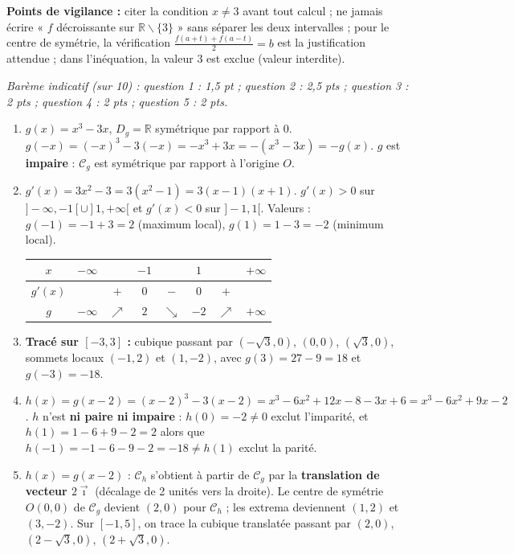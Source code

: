 \documentclass[11pt]{article}
\def\setminus{\mathbin{\backslash}}\let\smallsetminus\setminus
\begin{document}
\begin{corrige}
\begin{enumerate}
    \textbf{Points de vigilance :} citer la condition $x \neq 3$ avant tout calcul ; ne jamais écrire « $f$ décroissante sur $\mathbb{R}\setminus\{3\}$ » sans séparer les deux intervalles ; pour le centre de symétrie, la vérification $\frac{f(a+t)+f(a-t)}{2}=b$ est la justification attendue ; dans l'inéquation, la valeur $3$ est exclue (valeur interdite).
\end{enumerate}
\end{corrige}

\begin{corrige}
\emph{Barème indicatif (sur 10) : question 1 : 1,5 pt ; question 2 : 2,5 pts ; question 3 : 2 pts ; question 4 : 2 pts ; question 5 : 2 pts.}
\begin{enumerate}
    \item $g(x)=x^3-3x$, $D_g=\mathbb{R}$ symétrique par rapport à $0$. $g(-x)=(-x)^3-3(-x)=-x^3+3x=-(x^3-3x)=-g(x)$. $g$ est \textbf{impaire} : $\mathcal{C}_g$ est symétrique par rapport à l'origine $O$.
    \item $g'(x)=3x^2-3=3(x^2-1)=3(x-1)(x+1)$. $g'(x)>0$ sur $]-\infty,-1[\cup]1,+\infty[$ et $g'(x)<0$ sur $]-1,1[$. Valeurs : $g(-1)=-1+3=2$ (maximum local), $g(1)=1-3=-2$ (minimum local).
    \begin{center}
    \begin{tabular}{|c|ccccccc|}\hline
    $x$ & $-\infty$ & & $-1$ & & $1$ & & $+\infty$ \\ \hline
    $g'(x)$ & & $+$ & $0$ & $-$ & $0$ & $+$ & \\ \hline
    $g$ & $-\infty$ & $\nearrow$ & $2$ & $\searrow$ & $-2$ & $\nearrow$ & $+\infty$ \\ \hline
    \end{tabular}
    \end{center}
    \item \textbf{Tracé sur $[-3,3]$ :} cubique passant par $(-\sqrt{3},0)$, $(0,0)$, $(\sqrt{3},0)$, sommets locaux $(-1,2)$ et $(1,-2)$, avec $g(3)=27-9=18$ et $g(-3)=-18$.
    \item $h(x)=g(x-2)=(x-2)^3-3(x-2)=x^3-6x^2+12x-8-3x+6=x^3-6x^2+9x-2$. $h$ n'est \textbf{ni paire ni impaire} : $h(0)=-2 \neq 0$ exclut l'imparité, et $h(1)=1-6+9-2=2$ alors que $h(-1)=-1-6-9-2=-18 \neq h(1)$ exclut la parité.
    \item $h(x)=g(x-2)$ : $\mathcal{C}_h$ s'obtient à partir de $\mathcal{C}_g$ par la \textbf{translation de vecteur $2\vec{\imath}$} (décalage de 2 unités vers la droite). Le centre de symétrie $O(0,0)$ de $\mathcal{C}_g$ devient $(2,0)$ pour $\mathcal{C}_h$ ; les extrema deviennent $(1,2)$ et $(3,-2)$. Sur $[-1,5]$, on trace la cubique translatée passant par $(2,0)$, $(2-\sqrt{3},0)$, $(2+\sqrt{3},0)$.
    

\end{enumerate}
\end{corrige}
\end{document}
